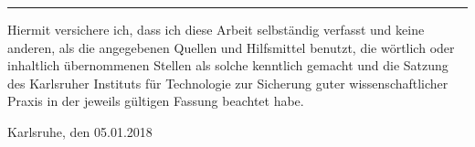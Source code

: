 \documentclass[12pt,a4paper,twoside, enabledeprecatedfontcommands]{scrartcl}
\numberwithin{equation}{section}
\begin{document}

\vspace*{0pt}\vfill

\hrule\medskip

Hiermit versichere ich, dass ich diese Arbeit selbständig verfasst und keine anderen, 
als die angegebenen Quellen und Hilfsmittel benutzt, die wörtlich oder inhaltlich 
übernommenen Stellen als solche kenntlich gemacht und die Satzung des Karlsruher 
Instituts für Technologie zur Sicherung guter wissenschaftlicher Praxis in der jeweils 
gültigen Fassung beachtet habe.

\bigskip

\noindent
Karlsruhe, den 05.01.2018


\vspace*{5cm}

\clearpage



\addto{}
\end{document}
